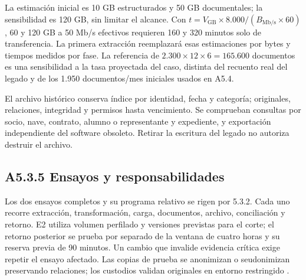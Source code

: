 La estimación inicial es 10 GB estructurados y 50 GB documentales; la sensibilidad es 120 GB, sin limitar el alcance. Con \(t=V_{\mathrm{GB}}\times8.000/(B_{\mathrm{Mb/s}}\times60)\), 60 y 120 GB a 50 Mb/s efectivos requieren 160 y 320 minutos solo de transferencia. La primera extracción reemplazará esas estimaciones por bytes y tiempos medidos por fase. La referencia de \(2.300\times12\times6=165.600\) documentos es una sensibilidad a la tasa proyectada del caso, distinta del recuento real del legado y de los 1.950 documentos/mes iniciales usados en A5.4.

El archivo histórico conserva índice por identidad, fecha y categoría; originales, relaciones, integridad y permisos hasta vencimiento. Se comprueban consultas por socio, nave, contrato, alumno o representante y expediente, y exportación independiente del software obsoleto. Retirar la escritura del legado no autoriza destruir el archivo.

\subsection*{A5.3.5 Ensayos y responsabilidades}

Los dos ensayos completos y su programa relativo se rigen por 5.3.2. Cada uno recorre extracción, transformación, carga, documentos, archivo, conciliación y retorno. E2 utiliza volumen perfilado y versiones previstas para el corte; el retorno posterior se prueba por separado de la ventana de cuatro horas y su reserva previa de 90 minutos. Un cambio que invalide evidencia crítica exige repetir el ensayo afectado. Las copias de prueba se anonimizan o seudonimizan preservando relaciones; los custodios validan originales en entorno restringido \parencite[RT-05.13 y RT-11.25]{pucv-bases-transversales}.

